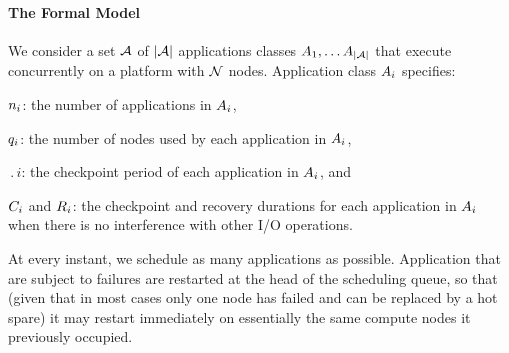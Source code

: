 \paragraph*{The Formal Model}
We consider a set ${\mathcal A}$ of $|{\mathcal A}|$ applications classes
$A_{1}, \ldots A_{|{\mathcal A}|}$ that execute concurrently on a platform with
${\mathcal N}$ nodes. Application class $A_{i}$ specifies:
\begin{compactitem}
\item $n_{i}$: the number of applications in $A_{i}$,
\item $q_{i}$: the number of nodes used by each application in $A_{i}$,
\item $\period{i}$: the checkpoint period of each application in $A_{i}$, and
\item $C_{i}$ and $R_{i}$: the checkpoint and recovery durations for each application in $A_{i}$ when there is no interference with other I/O operations.
\end{compactitem}
At every instant, we schedule as many applications as possible.
Application that are subject to failures are restarted at the head of
the scheduling queue, so that (given that in most cases only one
node has failed and can be replaced by a hot spare) it may restart
immediately on essentially the same compute nodes it previously occupied.
